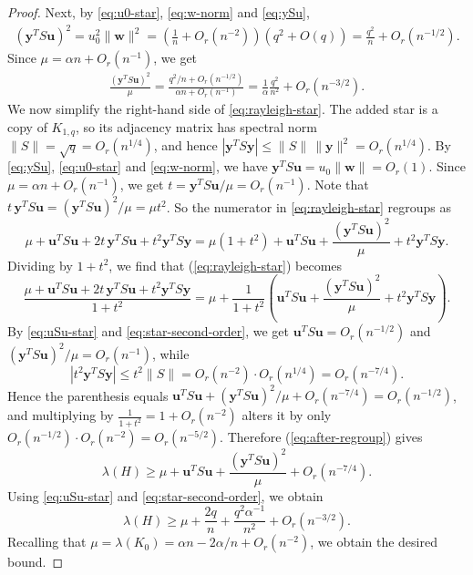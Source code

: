 \documentclass[11pt,a4paper]{article}
\theoremstyle{definition}
\theoremstyle{plain}
\renewcommand{\le}{\leqslant}
\renewcommand{\ge}{\geqslant}
\begin{document}
\begin{proof}
Next, by \eqref{eq:u0-star}, \eqref{eq:w-norm}  and \eqref{eq:ySu},
\begin{align*}
        (\bm{y}^TS\bm{u})^2
        =u_0^2\|\bm{w}\|^2 =\left(\frac1n+O_r(n^{-2})\right)(q^2+O(q)) 
        =\frac{q^2}{n}+O_r(n^{-1/2}). 
\end{align*} 
Since $\mu=\alpha n+O_r(n^{-1})$, we get
\begin{align}
        \frac{(\bm{y}^TS\bm{u})^2}{\mu}
        =\frac{q^2/n+O_r(n^{-1/2})}{\alpha n+O_r(n^{-1})}  
        =\frac1\alpha\frac{q^2}{n^2}+O_r(n^{-3/2}) .
        \label{eq:star-second-order}
\end{align} 
We now simplify the right-hand side of \eqref{eq:rayleigh-star}. The added star is a
copy of $K_{1,q}$, so its adjacency matrix has spectral norm
$ \|S\|=\sqrt q=O_r(n^{1/4})$, 
and hence $|\bm{y}^TS \bm{y}|\le\|S\|\,\|\bm{y}\|^2=O_r(n^{1/4})$. By \eqref{eq:ySu},
\eqref{eq:u0-star} and \eqref{eq:w-norm},
we have $\bm{y}^TS \bm{u}=u_0\| \bm{w}\|=O_r(1)$. Since
$\mu=\alpha n+O_r(n^{-1})$,
we get $t={\bm{y}^TS\bm{u}}/{\mu}=O_r(n^{-1})$. 
Note that $t\,\bm{y}^TS\bm{u}=(\bm{y}^TS\bm{u})^2/\mu=\mu t^2$. So the numerator in \eqref{eq:rayleigh-star} regroups as
\[
        \mu+\bm{u}^TS\bm{u}+2t\,\bm{y}^TS\bm{u}+t^2\bm{y}^TS\bm{y}
        =\mu(1+t^2)+\bm{u}^TS\bm{u}+\frac{(\bm{y}^TS\bm{u})^2}{\mu}+t^2\bm{y}^TS\bm{y} .
\]
Dividing by $1+t^2$, we find that (\ref{eq:rayleigh-star}) becomes 
\begin{equation} \label{eq:after-regroup}
        \frac{\mu+\bm{u}^TS\bm{u}+2t\,\bm{y}^TS\bm{u}+t^2\bm{y}^TS\bm{y}}{1+t^2}
        =\mu+\frac{1}{1+t^2}\left(\bm{u}^TS\bm{u}+\frac{(\bm{y}^TS\bm{u})^2}{\mu}+t^2\bm{y}^TS\bm{y}\right).
\end{equation}
By \eqref{eq:uSu-star} and \eqref{eq:star-second-order}, we get 
$\bm{u}^TS\bm{u}=O_r(n^{-1/2})$ and $(\bm{y}^TS\bm{u})^2/\mu=O_r(n^{-1})$, while
\[
        |t^2\bm{y}^TS\bm{y}|\le t^2\|S\|=O_r(n^{-2})\cdot O_r(n^{1/4})=O_r(n^{-7/4}).
\]
Hence the parenthesis equals $\bm{u}^TS\bm{u}+(\bm{y}^TS\bm{u})^2/\mu+O_r(n^{-7/4})=O_r(n^{-1/2})$, and
multiplying by $\tfrac1{1+t^2}=1+O_r(n^{-2})$ alters it by only
$O_r(n^{-1/2})\cdot O_r(n^{-2})=O_r(n^{-5/2})$. Therefore (\ref{eq:after-regroup}) gives 
\begin{equation*}
        \lambda(H)
        \ge\mu+\bm{u}^TS\bm{u}+\frac{(\bm{y}^TS\bm{u})^2}{\mu}+O_r(n^{-7/4}).
\end{equation*} 
Using \eqref{eq:uSu-star} and \eqref{eq:star-second-order}, we obtain 
\[
        \lambda(H)
        \ge \mu+\frac{2q}{n}+\frac{q^2\alpha^{-1}}{ n^2}+O_r(n^{-3/2}).
\]
Recalling that $\mu = \lambda (K_0)= \alpha n- {2\alpha}/{n} + O_r(n^{-2})$, we 
obtain the desired bound.  
\end{proof}
\end{document}
